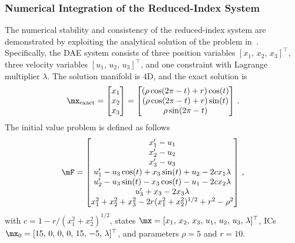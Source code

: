\subsubsection{Numerical Integration of the Reduced-Index System}
\label{chap4:sec:numerical_integration}

The numerical stability and consistency of the reduced-index system are demonstrated by exploiting the analytical solution of the problem in~\cite{campbell1995constraint}. Specifically, the \ac{DAE} system consists of three position variables $[x_{1}, \, x_{2}, \, x_{3}]^\top$, three velocity variables $[u_{1}, \, u_{2}, \, u_{3}]^\top$, and one constraint with Lagrange multiplier $\lambda$. The solution manifold is 4D, and the exact solution is
%
\begin{equation*}
  \mx_\text{exact} = \begin{bmatrix}
    x_{1} \\ x_{2} \\ x_{3}
  \end{bmatrix} = \begin{bmatrix}
    (\rho \cos(2\pi - t) + r) \cos(t) \\
    (\rho \cos(2\pi - t) + r) \sin(t) \\
    \rho \sin(2\pi - t)
  \end{bmatrix} \, \text{.}
\end{equation*}
%
The initial value problem is defined as follows
%
\begin{equation}
  \label{chap4:eq:torus}
  \mF = \begin{bmatrix}
    x^{\prime}_{1} - u_{1} \\
    x^{\prime}_{2} - u_{2} \\
    x^{\prime}_{3} - u_{3} \\
    u^{\prime}_{1} - u_{3}\cos(t) + x_{3}\sin(t) + u_{2} - 2 c x_{1}\lambda \\
    u^{\prime}_{2} - u_{3}\sin(t) - x_{3}\cos(t) - u_{1} - 2 c x_{2}\lambda \\
    u^{\prime}_{3} + x_{3} - 2x_{3}\lambda \\
    x_{1}^2 + x_{2}^2 + x_{3}^2 - 2r(x_{1}^2 + x_{2}^2)^{1/2} + r^2 - \rho^2
  \end{bmatrix} \, \text{,}
\end{equation}
%
with $c = 1 - {r} / {(x_{1}^2 + x_{2}^2)^{1/2}}$, states $\mx = [x_{1}, \, x_{2}, \, x_{3}, \, u_{1}, \, u_{2}, \, u_{3}, \, \lambda]^{\top}$, \acp{IC} $\mx_{0} = [15, \, 0, \, 0, \, 0, \, 15, \, -5, \, \lambda]^{\top}$, and parameters $\rho = 5$ and $r = 10$.

